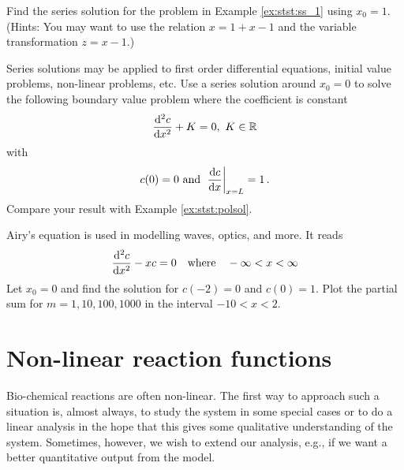 \begin{exerciseregion}
	\begin{exercise}
		Find the series solution for the problem in Example \ref{ex:stst:ss_1} using $x_0=1$.
		(Hints: You may want to use the relation $x = 1 + x - 1$ and the variable transformation
		$z=x-1$.)
	\end{exercise}


	\begin{exercise}
		Series solutions may be applied to first order differential equations, initial value
		problems, non-linear problems, etc. Use a series solution around $x_0=0$ to solve the 
		following boundary value problem where the coefficient is constant
		\begin{equation}
			\frac{\d^2c}{\d x^2} + K = 0 ,  \ K \in \R
		\end{equation}
		with 
		\begin{eqnarray}
			c(0) = 0  \text{ and } \left. \frac{\mathrm{d} c}{\mathrm{d} x}\right|_{x=L}=1 \, .
		\end{eqnarray}
		Compare your result with Example \ref{ex:stst:polsol}.
	\end{exercise}

	\begin{exercise}
		Airy's equation is used in modelling waves, optics, and more. It reads 
		\begin{eqnarray}
			\frac{\d^2c}{\d x^2} - x c = 0 \ \ \text{ where } \ \ -\infty < x < \infty
		\end{eqnarray}
		Let $x_0=0$ and find the solution for $c(-2)=0$ and $c(0)=1$. Plot the partial sum for $m=1,
		10, 100, 1000$ in the interval $-10 < x < 2$.  
	\end{exercise}

\end{exerciseregion}


\section{Non-linear reaction functions}
Bio-chemical reactions are often non-linear. The first way to approach such a situation is, almost always, to study the
system in some special cases or to do a linear analysis in the hope that this gives some qualitative
understanding of the system. Sometimes, however, we wish to extend our analysis, e.g., 
if we want a better quantitative output from the model. 

